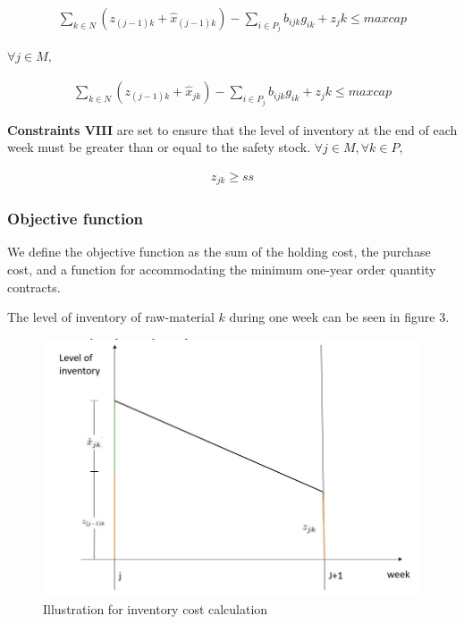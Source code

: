 \documentclass[preprint, 3p,
authoryear]{elsarticle} %
\begin{document}
\begin{align}
  \sum_{k \in N} (z_{(j-1)k} + \hat{x}_{(j-1)k}) - \sum_{i \in P_j} b_{ijk} g_{ik} + z_jk \leq maxcap
\end{align}

\(\forall j \in M,\)

\begin{align}
  \sum_{k \in N} (z_{(j-1)k} + \hat{x}_{jk}) - \sum_{i \in P_j} b_{ijk} g_{ik} + z_jk \leq maxcap
\end{align}

\textbf{Constraints VIII} are set to ensure that the level of inventory
at the end of each week must be greater than or equal to the safety
stock. \(\forall j \in M, \forall k \in P,\)

\begin{align}
  z_{jk} \geq ss
\end{align}

\hypertarget{objective-function}{%
\subsubsection{Objective function}\label{objective-function}}

We define the objective function as the sum of the holding cost, the
purchase cost, and a function for accommodating the minimum one-year
order quantity contracts.

The level of inventory of raw-material \(k\) during one week can be seen
in figure 3.

\newpage

\begin{figure}

{\centering \includegraphics[width=0.7\linewidth]{inventory} 

}

\caption{Illustration for inventory cost calculation}\label{fig:unnamed-chunk-4}
\end{figure}
\end{document}
